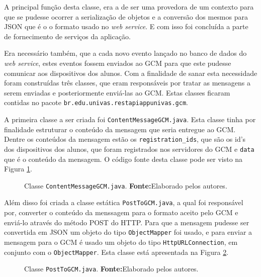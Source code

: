 	
	\par A principal função desta classe, era a de ser uma provedora de um contexto
para que se pudesse ocorrer a serialização de objetos e a conversão dos mesmos
para JSON que é o o formato usado no \textit{web service}. E com isso foi
concluída a parte de fornecimento de serviços da aplicação.
	
	\par Era necessário também, que a cada novo evento lançado no banco de dados do
\textit{web service}, estes eventos fossem enviados ao GCM para que este pudesse
comunicar aos dispositivos dos alunos. Com a finalidade de sanar esta
necessidade foram construídas três classes, que eram responsáveis por tratar as
mensagens a serem enviadas e posteriormente enviá-las ao GCM. Estas classes
ficaram contidas no pacote \texttt{br.edu.univas.restapiappunivas.gcm}. 

	\par A primeira classe a ser criada foi \texttt{ContentMessageGCM.java}. Esta
classe tinha por finalidade estruturar o conteúdo da mensagem que seria
entregue ao GCM. Dentre os conteúdos da mensagem estão os
\texttt{registration\_ids}, que são os id's dos dispositivos dos alunos, que
foram registrados nos servidores do GCM e \texttt{data} que é o conteúdo da
mensagem. O código fonte desta classe pode ser visto na Figura
\ref{fig:desws30}.

	\begin{figure}[h!]
		
		\caption[Classe ContentMessageGCM.java]{Classe
		\texttt{ContentMessageGCM.java}.
		\textbf{Fonte:}Elaborado pelos autores.}
		\label{fig:desws30}
	\end{figure}

	\pagebreak
	
	\par Além disso foi criada a classe estática \texttt{PostToGCM.java}, a qual
foi responsável por, converter o conteúdo da menssagem para o formato aceito
pelo GCM e enviá-lo através do método POST do HTTP. Para que a mensagem pudesse
ser convertida em JSON um objeto do tipo \texttt{ObjectMapper} foi usado, e
para enviar a mensagem para o GCM é usado um objeto do tipo
\texttt{HttpURLConnection}, em conjunto com o \texttt{ObjectMapper}. Esta classe
está apresentada na Figura \ref{fig:desws31}.

	\begin{figure}[h!]
		
		\caption[Classe PostToGCM.java]{Classe \texttt{PostToGCM.java}.
		\textbf{Fonte:}Elaborado pelos autores.}
		\label{fig:desws31}
	\end{figure}
	
